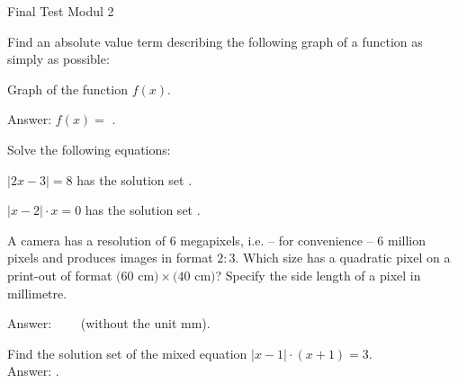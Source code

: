 \begin{MTest}{Final Test Modul 2}

\begin{MExercise}
Find an absolute value term describing the following graph of a function as simply as possible:

\begin{center}
\par
Graph of the function $f(x)$.
\end{center}

Answer: $f(x)=$ \: .
\end{MExercise}

\begin{MExercise}
Solve the following equations:
\begin{MExerciseItems}
\item{$|2x-3|=8$ has the solution set .}
\item{$|x-2|\cdot x=0$ has the solution set .} 
\end{MExerciseItems}
\end{MExercise}

\begin{MExercise}
A camera has a resolution of $6$ megapixels, i.e. -- for convenience -- 
6 million pixels and produces images in format $2:3$. Which size has a 
quadratic pixel on a print-out of format $(60$ cm$) \times (40$ cm$)$? 
Specify the side length of a pixel in millimetre. 

Answer: \ \ \ \ (without the unit mm).
\end{MExercise}

\begin{MExercise}
Find the solution set of the mixed equation $|x-1|\cdot (x+1)=3$.\\
Answer: .
\end{MExercise}


\end{MTest}


\newpage
\MPrintIndex


